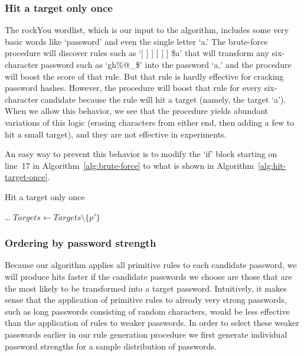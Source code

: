\documentclass{article}
\begin{document}
\subsubsection{Hit a target only once}

The rockYou wordlist, which is our input to the algorithm, includes some very
basic words like `password' and even the single letter `a.' The brute-force
procedure will discover rules such as `] ] ] ] ] ] \$a' that will transform any
six-character password such as `gh\%@\_\$' into the password `a,' and the
procedure will boost the score of that rule. But that rule is hardly effective
for cracking password hashes. However, the procedure will boost that rule for
every six-character candidate because the rule will hit a target (namely, the
target `a'). When we allow this behavior, we see that the procedure yields
abundant variations of this logic (erasing characters from either end, then
adding a few to hit a small target), and they are not effective in experiments.

An easy way to prevent this behavior is to modify the `if' block starting on
line~17 in Algorithm~\ref{alg:brute-force} to what is shown in
Algorithm~\ref{alg:hit-target-once}.

\begin{algorithm}[h!]\caption{Hit a target only once}
\begin{algorithmic}
        \State \dots
      \EndFor
      \State $Targets \gets Targets \setminus \{p'\}$
    \EndIf
\end{algorithmic}
\label{alg:hit-target-once}
\end{algorithm}

\subsubsection{Ordering by password strength}

Because our algorithm applies all primitive rules to each candidate password,
we will produce hits faster if the candidate passwords we choose are those that
are the most likely to be transformed into a target password. Intuitively, it
makes sense that the application of primitive rules to already very strong
passwords, such as long passwords consisting of random characters, would be less
effective than the application of rules to weaker passwords. In order to select
these weaker passwords earlier in our rule generation procedure we first
generate individual password strengths for a sample distribution of passwords.
\end{document}

